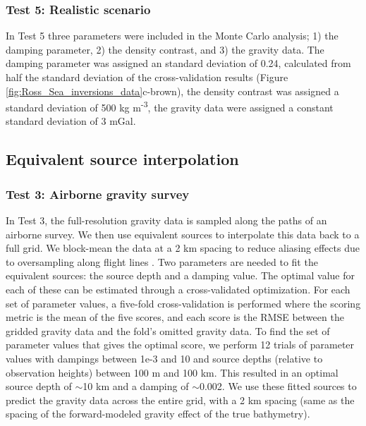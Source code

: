 \documentclass[tc, manuscript]{copernicus}
\begin{document}
\subsubsection{Test 5: Realistic scenario}
In Test 5 three parameters were included in the Monte Carlo analysis; 1) the damping parameter, 2) the density contrast, and 3) the gravity data. The damping parameter was assigned an standard deviation of 0.24, calculated from half the standard deviation of the cross-validation results (Figure \ref{fig:Ross_Sea_inversions_data}c-brown), the density contrast was assigned a standard deviation of 500 kg m\textsuperscript{-3}, the gravity data were assigned a constant standard deviation of 3 mGal.

\subsection{Equivalent source interpolation}\label{app:equivalent_source_interpolation}
\subsubsection{Test 3: Airborne gravity survey}
In Test 3, the full-resolution gravity data is sampled along the paths of an airborne survey. We then use equivalent sources to interpolate this data back to a full grid. We block-mean the data at a 2 km spacing to reduce aliasing effects due to oversampling along flight lines \citep{uiedaverde2018}. Two parameters are needed to fit the equivalent sources: the source depth and a damping value. The optimal value for each of these can be estimated through a cross-validated optimization. For each set of parameter values, a five-fold cross-validation is performed where the scoring metric is the mean of the five scores, and each score is the RMSE between the gridded gravity data and the fold's omitted gravity data. To find the set of parameter values that gives the optimal score, we perform 12 trials of parameter values with dampings between 1e-3 and 10 and source depths (relative to observation heights) between 100 m and 100 km. This resulted in an optimal source depth of $\sim$10 km and a damping of $\sim$0.002. We use these fitted sources to predict the gravity data across the entire grid, with a 2 km spacing (same as the spacing of the forward-modeled gravity effect of the true bathymetry).
\end{document}
